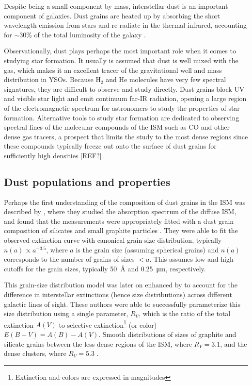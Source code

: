 Despite being a small component by mass, interstellar dust is an important component of galaxies. Dust grains are heated up by absorbing the short wavelength emission from stars and re-radiate in the thermal infrared, accounting for $\sim 30\%$ of the total luminosity of the galaxy \citep{Mathis:1990jk}. 

Observationally, dust plays perhaps the most important role when it comes to studying star formation. It usually is assumed that dust is well mixed with the gas, which makes it an excellent tracer of the gravitational well and mass distribution in YSOs. Because H$_2$ and He molecules have very few spectral signatures, they are difficult to observe and study directly. Dust grains block UV and visible star light and emit continuum far-IR radiation, opening a large region of the electromagnetic spectrum for astronomers to study the properties of star formation. Alternative tools to study star formation are dedicated to observing spectral lines of the molecular compounds of the ISM such as CO and other dense gas tracers, a prospect that limits the study to the most dense regions since these compounds typically freeze out onto the surface of dust grains for sufficiently high densities [REF?]%


\subsection{Dust populations and properties}


Perhaps the first understanding of the composition of dust grains in the ISM was described by \cite{Mathis:1977hp}, where they studied the absorption spectrum of the diffuse ISM, and found that the measurements were appropriately fitted with a dust grain composition of silicates and small graphite particles \citep{Stecher:1965eq}. They were able to fit the observed extinction curve with canonical grain-size distribution, typically $n(a) \propto a^{-3.5}$, where $a$ is the grain size (assuming spherical grains) and $n(a)$ corresponds to the number of grains of sizes $<a$. This assumes low and high cutoffs for the grain sizes, typically \SI{50}{\angstrom} and \SI{0.25}{\micro\meter}, respectively.

This grain-size distribution model was later on enhanced by \cite{Cardelli:1989dp} to account for the difference in interstellar extinctions (hence size distributions) across different galactic lines of sight. These authors were able to successfully parameterize this size distribution using a single parameter, $R_V$, which is the ratio of the total extinction $A(V)$ to selective extinction\footnote{Extinction and colors are expressed in magnitudes} (or color) $E(B-V) = A(B) - A(V)$. Smooth distributions of sizes of graphite and silicate grains between the less dense regions of the ISM, where $R_V = 3.1$, and the dense clusters, where $R_V = 5.3$ \citep{Kim:1994iu}. 

